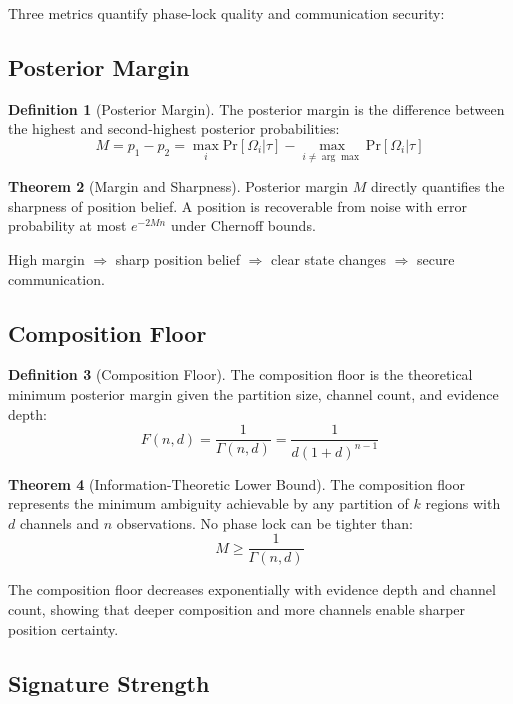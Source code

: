 \documentclass[11pt,a4paper]{article}
\theoremstyle{definition}
\newtheorem{definition}{Definition}[section]
\newtheorem{theorem}[definition]{Theorem}
\newcommand{\pr}[1]{\mathrm{Pr}\left[#1\right]}
\begin{document}
Three metrics quantify phase-lock quality and communication security:

\subsection{Posterior Margin}

\begin{definition}[Posterior Margin]
The posterior margin is the difference between the highest and second-highest posterior probabilities:
\[
M = p_1 - p_2 = \max_i \pr{\Omega_i | \tau} - \max_{i \neq \arg\max} \pr{\Omega_i | \tau}
\]
\end{definition}

\begin{theorem}[Margin and Sharpness]
Posterior margin $M$ directly quantifies the sharpness of position belief. A position is recoverable from noise with error probability at most $e^{-2Mn}$ under Chernoff bounds.
\end{theorem}

High margin $\Rightarrow$ sharp position belief $\Rightarrow$ clear state changes $\Rightarrow$ secure communication.

\subsection{Composition Floor}

\begin{definition}[Composition Floor]
The composition floor is the theoretical minimum posterior margin given the partition size, channel count, and evidence depth:
\[
F(n, d) = \frac{1}{\Gamma(n, d)} = \frac{1}{d(1+d)^{n-1}}
\]
\end{definition}

\begin{theorem}[Information-Theoretic Lower Bound]
The composition floor represents the minimum ambiguity achievable by any partition of $k$ regions with $d$ channels and $n$ observations. No phase lock can be tighter than:
\[
M \geq \frac{1}{\Gamma(n, d)}
\]
\end{theorem}

The composition floor decreases exponentially with evidence depth and channel count, showing that deeper composition and more channels enable sharper position certainty.

\subsection{Signature Strength}
\end{document}
